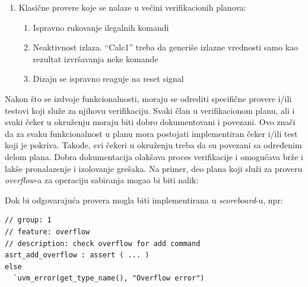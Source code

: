 \begin{enumerate}
\item Klasične provere koje se nalaze u većini verifikacionih planova:
  \begin{enumerate}
  \item Ispravno rukovanje ilegalnih komandi
  \item Neaktivnost izlaza. ``Calc1'' treba da generiše izlazne vrednosti samo
    kao rezultat izvršavanja neke komande
  \item Dizajn se ispravno reaguje na reset signal
  \end{enumerate}

\end{enumerate}

Nakon što se izdvoje funkcionalnosti, moraju se odrediti specifične provere
i/ili testovi koji služe za njihovu verifikaciju. Svaki član u verifikacionom
planu, ali i svaki čeker u okruženju moraju biti dobro dokumentovani i povezani.
Ovo znači da za svaku funkcionalnost u planu mora postojati implementiran čeker
i/ili test koji je pokriva. Takođe, svi čekeri u okruženju treba da su povezani
sa određenim delom plana. Dobra dokumentacija olakšava proces verifikacije i
omogućava brže i lakše pronalazenje i izolovanje grešaka. Na primer, deo plana
koji služi za proveru \emph{overflow}-a za operaciju sabiranja mogao bi biti
nalik:

\begin{table}[h!]
  \centering
  \caption{Primer \emph{overflow} provere}
  \label{tab:vplan_example}
\end{table}

Dok bi odgovarajuća provera mogla biti implementirana u \emph{scoreboard}-u, npr:

\begin{lstlisting}
// group: 1
// feature: overflow
// description: check overflow for add command
asrt_add_overflow : assert ( ... )
else
  `uvm_error(get_type_name(), "Overflow error")
\end{lstlisting}

